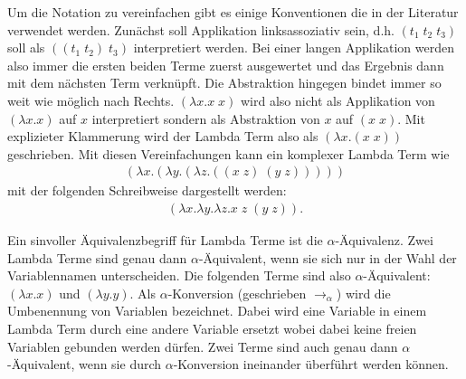 \documentclass[ngerman]{article}
\begin{document}
Um die Notation zu vereinfachen gibt es einige Konventionen die in der Literatur verwendet werden.
Zunächst soll Applikation linksassoziativ sein, d.h. $(t_1 \; t_2 \; t_3)$ soll als $((t_1 \; t_2) \; t_3)$ interpretiert werden. Bei einer langen Applikation werden also immer die ersten beiden Terme zuerst ausgewertet und das Ergebnis dann mit dem nächsten Term verknüpft. Die Abstraktion hingegen bindet immer so weit wie möglich nach Rechts. $(\lambda x.x \; x)$ wird also nicht als Applikation von $(\lambda x.x)$ auf $x$ interpretiert sondern als Abstraktion von $x$ auf $(x \; x)$. Mit explizieter Klammerung wird der Lambda Term also als $(\lambda x.(x \; x))$ geschrieben. Mit diesen Vereinfachungen kann ein komplexer Lambda Term wie
\begin{align*}
    (\lambda x.(\lambda y.(\lambda z.((x \; z) \; (y \; z)))))
\end{align*}
mit der folgenden Schreibweise dargestellt werden:
\begin{align*}
    (\lambda x. \lambda y. \lambda z. x \; z \; (y \; z)).
\end{align*}

Ein sinvoller Äquivalenzbegriff für Lambda Terme ist die $\alpha$-Äquivalenz. Zwei Lambda Terme sind genau dann $\alpha$-Äquivalent, wenn sie sich nur in der Wahl der Variablennamen unterscheiden. Die folgenden Terme sind also $\alpha$-Äquivalent: $(\lambda x.x)$ und $(\lambda y.y)$.
Als $\alpha$-Konversion (geschrieben $\rightarrow_\alpha$) wird die Umbenennung von Variablen bezeichnet. Dabei wird eine Variable in einem Lambda Term durch eine andere Variable ersetzt wobei dabei keine freien Variablen gebunden werden dürfen. Zwei Terme sind auch genau dann $\alpha$-Äquivalent, wenn sie durch $\alpha$-Konversion ineinander überführt werden können.
\end{document}

